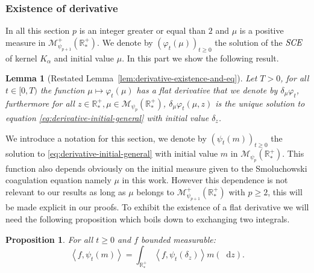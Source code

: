\documentclass[11pt,a4paper]{article}
\newcommand{\RRP}{\mathbb{R}^+_*}
\newcommand{\MC}{\mathcal{M}}
\newcommand{\SCE}{\emph{SCE}}
\newcommand{\Proc}[1]{\left(#1\right)_{t\geq 0}}
\newcommand{\brac}[1]{\left\langle#1\right\rangle}
\newcommand{\dd}{\mathop{}\!\mathrm{d}}
\newtheorem{lemma}[theorem]{Lemma}
\newtheorem{proposition}[theorem]{Proposition}
\begin{document}
\subsubsection{Existence of derivative}
In all this section $p$ is an integer greater or equal than $2$ and $\mu$ is a positive measure in $\MC^+_{\psi_{p+1}}(\RRP)$. We denote by $\Proc{\varphi_t(\mu)}$ the solution of the $\SCE$ of kernel $K_\alpha$ and initial value $\mu$. In this part we show the following result.
\begin{lemma}[Restated Lemma~\ref{lem:derivative-existence-and-eq}]
    Let $T > 0$, for all $t \in [0,T)$ the function $ \mu \mapsto \varphi_t(\mu)$ has a flat derivative that we denote by $\delta_\mu\varphi_t$, furthermore for all $z \in \RRP, \mu \in \MC_{\psi_p}(\RRP)$, $\delta_\mu\varphi_t(\mu,z)$ is the unique solution to equation \eqref{eq:derivative-initial-general} with initial value $\delta_z$.
\end{lemma}
We introduce a notation for this section, we denote by $\Proc{\psi_t(m)}$ the solution to \eqref{eq:derivative-initial-general} with initial value $m$ in $\MC_{\psi_p}(\RRP)$. This function also depends obviously on the initial measure given to the Smoluchowski coagulation equation namely $\mu$ in this work. However this dependence is not relevant to our results as long as $\mu$ belongs to $\MC^+_{\psi_{p+1}}(\RRP)$ with $p\geq 2$, this will be made explicit in our proofs. To exhibit the existence of a flat derivative we will need the following proposition which boils down to exchanging two integrals.
\begin{proposition}\label{prop:derivative-prop-fubini}
    For all $t \geq 0$ and $f$ bounded measurable:
    \[\brac{f,\psi_t(m)} = \int_{\RRP} \brac{f,\psi_t\left(\delta_z\right)}m(\dd z).\]
\end{proposition}
\end{document}

